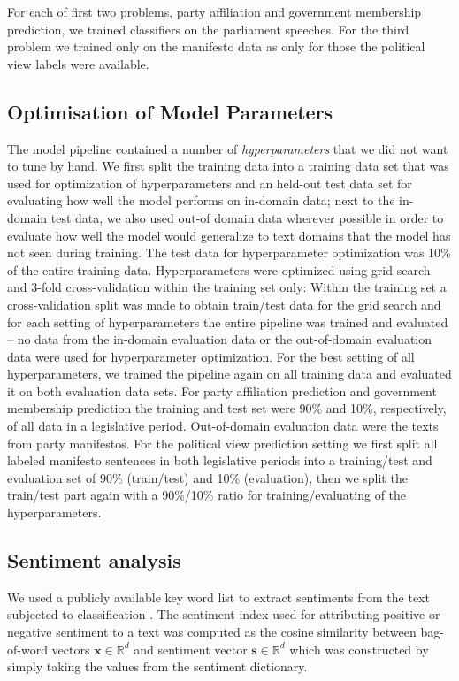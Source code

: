 \documentclass[runningheads,a4paper]{llncs}
\renewcommand{\vec}[1]{\mathbf{#1}}
\newcommand{\R}{\mathds{R}}
\begin{document}
For each of first two problems, party affiliation and government membership prediction, we trained classifiers on the parliament speeches. For the third problem we trained only on the manifesto data as only for those the political view labels were available. 

\subsection{Optimisation of Model Parameters}\label{sec:crossvalidation}
The model pipeline contained a number of {\em hyperparameters} that we did not want to tune by hand. 
We first split the training data into a training data set that was used for optimization of hyperparameters and an held-out test data set for evaluating how well the model performs on in-domain data; next to the in-domain test data, we also used out-of domain data wherever possible in order to evaluate how well the model would generalize to text domains that the model has not seen during training. The test data for hyperparameter optimization was 10\% of the entire training data. Hyperparameters were optimized using grid search and 3-fold cross-validation within the training set only: Within the training set a cross-validation split was made to obtain train/test data for the grid search and for each setting of hyperparameters the entire pipeline was trained and evaluated -- no data from the in-domain evaluation data or the out-of-domain evaluation data were used for hyperparameter optimization. For the best setting of all hyperparameters, we trained the pipeline again on all training data and evaluated it on both evaluation data sets. For party affiliation prediction and government membership prediction the training and test set were 90\% and 10\%, respectively, of all data in a legislative period. Out-of-domain evaluation data were the texts from party manifestos. For the political view prediction setting we first split all labeled manifesto sentences in both legislative periods into a training/test and evaluation set of 90\% (train/test) and 10\% (evaluation), then we split the train/test part again with a 90\%/10\% ratio for training/evaluating of the hyperparameters. 

\subsection{Sentiment analysis}\label{sec:sentiment_analysis_methods}
We used a publicly available key word list to extract sentiments from the text subjected to classification \cite{remquahey2010}. The sentiment index used for attributing positive or negative sentiment to a text was computed  as the cosine similarity between bag-of-word vectors $\vec{x}\in\R^d$ and sentiment vector $\vec{s}\in\R^d$ which was constructed by simply taking the values from the sentiment dictionary. 
\end{document}
